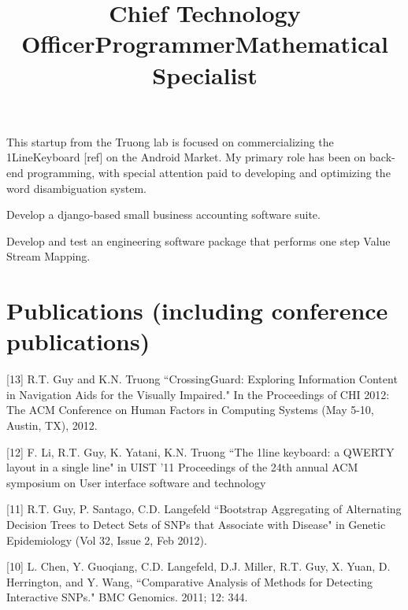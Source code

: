 \documentclass[overlapped,line,letterpaper]{res}
\begin{document}
\begin{resume}
 \title{Chief Technology Officer}
 \begin{position}
  This startup from the Truong lab is focused on commercializing the 1LineKeyboard [ref] on the Android Market. My primary role has been on back-end programming, with special attention paid to developing and optimizing the word disambiguation system. 
 \end{position}

 \title{Programmer}
 \begin{position}
   Develop a django-based small business accounting software suite. 
 \end{position}

 \title{Mathematical Specialist}
 \begin{position}
    Develop and test an engineering software package that performs one step Value Stream Mapping.
 \end{position}



\section{\bf Publications (including conference publications)}

[13] R.T. Guy and K.N. Truong ``CrossingGuard: Exploring Information Content in Navigation Aids for the Visually Impaired." In the Proceedings of CHI 2012: The ACM Conference on Human Factors in Computing Systems (May 5-10, Austin, TX), 2012.

[12] F. Li, R.T. Guy, K. Yatani, K.N. Truong ``The 1line keyboard: a QWERTY layout in a single line" in UIST '11 Proceedings of the 24th annual ACM symposium on User interface software and technology

[11] R.T. Guy, P. Santago, C.D. Langefeld ``Bootstrap Aggregating of Alternating Decision Trees to Detect Sets of SNPs that Associate with Disease" in Genetic Epidemiology (Vol 32, Issue 2, Feb 2012). 

[10] L. Chen, Y. Guoqiang, C.D. Langefeld, D.J. Miller, R.T. Guy, X. Yuan, D. Herrington, and Y. Wang, ``Comparative Analysis of Methods for Detecting Interactive SNPs." BMC Genomics. 2011; 12: 344. 


\end{resume}
\end{document}

